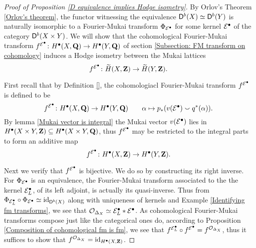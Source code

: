 \begin{proof}[Proof of Proposition \ref{D equivalence implies Hodge isometry}]
    By Orlov's Theorem \ref{Orlov's theorem}, the functor witnessing the equivalence $\mathsf{D}^b(X) \simeq \mathsf{D}^b(Y)$ is naturally isomorphic to a Fourier-Mukai transform $\Phi_{\mathcal E^\bullet}$ for some kernel $\mathcal E^\bullet$ of the category $\mathsf{D}^b(X \times Y)$. We will show that the cohomological Fourier-Mukai transform $f^{\mathcal E^\bullet} \colon H^\bullet(X, \mathbf Q) \to H^\bullet(Y, \mathbf Q)$ of section \ref{Subsection: FM transform on cohomology} induces a Hodge isometry between the Mukai lattices
    \[
        f^{\mathcal E^\bullet} \colon \widetilde{H}(X, \mathbf Z) \to \widetilde{H}(Y, \mathbf Z).
    \]

    First recall that by Definition \ref{}, the cohomologiacl Fourier-Mukai transform $f^{\mathcal E^\bullet}$ is defined to be
    \[
        f^{\mathcal E^\bullet} \colon H^\bullet(X, \mathbf Q) \to H^\bullet(Y, \mathbf Q) \qquad \alpha \mapsto p_*(v(\mathcal E^\bullet) \smallsmile q^*(\alpha)).
    \]
    By lemma \ref{Mukai vector is integral} the Mukai vector $v(\mathcal E^\bullet)$ lies in $H^\bullet(X \times Y, \mathbf Z) \subseteq H^\bullet(X \times Y, \mathbf Q)$, thus $f^{\mathcal E^\bullet}$ may be restricted to the integral parts to form an additive map
    \[
        f^{\mathcal E^\bullet} \colon H^\bullet(X, \mathbf Z) \to H^\bullet(Y, \mathbf Z).
    \]

    Next we verify that $f^{\mathcal E^\bullet}$ is bijective. We do so by constructing its right inverse. For $\Phi_{\mathcal E^\bullet}$ is an equivalence, the Fourier-Mukai transform associated to the the kernel $\mathcal E^\bullet_L$, of its left adjoint, is actually its quasi-inverse. Thus from $\Phi_{\mathcal E^\bullet_L} \circ \Phi_{\mathcal E^\bullet} \simeq \operatorname{id}_{\mathsf{D}^b(X)}$ along with uniqueness of kernels and Example \ref{Identifying fm transforms}, we see that $\mathcal{O}_{\Delta_X} \simeq \mathcal E^\bullet_L * \mathcal E^\bullet$. As cohomological Fourier-Mukai transforms compose just like the categorical ones do, according to Proposition \ref{Composition of cohomological fm is fm}, we see that $f^{\mathcal E^\bullet_L} \circ f^{\mathcal E^\bullet} = f^{\mathcal{O}_{\Delta_X}}$, thus it suffices to show that $f^{\mathcal{O}_{\Delta_X}} = \operatorname{id}_{H^\bullet(X, \mathbf Z)}$.
    

\end{proof}
